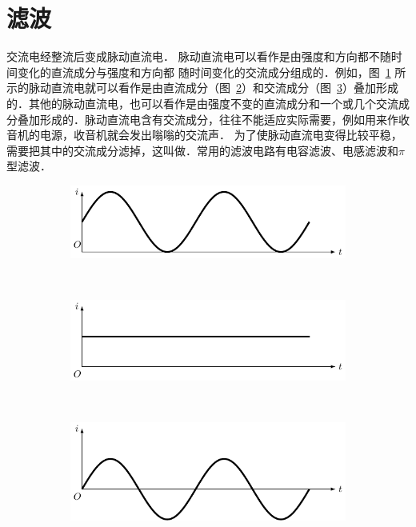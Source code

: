 \section{滤波}
交流电经整流后变成脉动直流电．
脉动直流电可以看作是由强度和方向都不随时间变化的直流成分与强度和方向都
随时间变化的交流成分组成的．例如，图~\ref{fig_C_3-36a} 所示的脉动直流电就可以看作是由直流成分（图~\ref{fig_C_3-36b}）和交流成分（图~\ref{fig_C_3-36c}）叠加形成的．其他的脉动直流电，也可以看作是由强度不变的直流成分和一个或几个交流成分叠加形成的．脉动直流电含有交流成分，往往不能适应实际需要，例如用来作收音机的电源，收音机就会发出嗡嗡的交流声．
为了使脉动直流电变得比较平稳，需要把其中的交流成分滤掉，这叫做．常用的滤波电路有电容滤波、电感滤波和$\pi$型滤波．
\begin{figure}[htbp]
    \centering
    \begin{subfigure}{0.8\linewidth}
        \centering
        \includegraphics{fig/C/3-36a.pdf}
        \caption{}\label{fig_C_3-36a}
    \end{subfigure}
    \\
    \begin{subfigure}{0.8\linewidth}
        \centering
        \includegraphics{fig/C/3-36b.pdf}
        \caption{}\label{fig_C_3-36b}
    \end{subfigure}
    \\
    \begin{subfigure}{0.8\linewidth}
        \centering
        \includegraphics{fig/C/3-36c.pdf}
        \caption{}\label{fig_C_3-36c}
    \end{subfigure}
    \caption{}\label{fig_C_3-36}
\end{figure}

